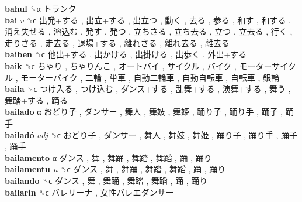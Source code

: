 \textbf{bahul} ␝α   トランク   \\
\textbf{bai} \emph{v}  ␝ϲ   出発+する ,  出立+する ,  出立つ ,  動く ,  去る ,  参る ,  和す ,  和する ,  消え失せる ,  溶込む ,  発す ,  発つ ,  立ちさる ,  立ち去る ,  立つ ,  立去る ,  行く ,  走りさる ,  走去る ,  退場+する ,  離れさる ,  離れ去る ,  離去る   \\
\textbf{baiben} ␝ϲ   他出+する ,  出かける ,  出掛ける ,  出歩く ,  外出+する   \\
\textbf{baik} ␝ϲ   ちゃり ,  ちゃりんこ ,  オートバイ ,  サイクル ,  バイク ,  モーターサイクル ,  モーターバイク ,  二輪 ,  単車 ,  自動二輪車 ,  自動自転車 ,  自転車 ,  銀輪   \\
\textbf{baila} ␝ϲ   つけ入る ,  つけ込む ,  ダンス+する ,  乱舞+する ,  演舞+する ,  舞う ,  舞踏+する ,  踊る   \\
\textbf{bailado} α   おどり子 ,  ダンサー ,  舞人 ,  舞妓 ,  舞姫 ,  踊り子 ,  踊り手 ,  踊子 ,  踊手   \\
\textbf{bailadó} \emph{adj}  ␝ϲ   おどり子 ,  ダンサー ,  舞人 ,  舞妓 ,  舞姫 ,  踊り子 ,  踊り手 ,  踊子 ,  踊手   \\
\textbf{bailamento} α   ダンス ,  舞 ,  舞踊 ,  舞踏 ,  舞蹈 ,  踊 ,  踊り   \\
\textbf{bailamentu} \emph{n}  ␝ϲ   ダンス ,  舞 ,  舞踊 ,  舞踏 ,  舞蹈 ,  踊 ,  踊り   \\
\textbf{bailando} ␝ϲ   ダンス ,  舞 ,  舞踊 ,  舞踏 ,  舞蹈 ,  踊 ,  踊り   \\
\textbf{bailarin} ␝ϲ   バレリーナ ,  女性バレエダンサー   \\
